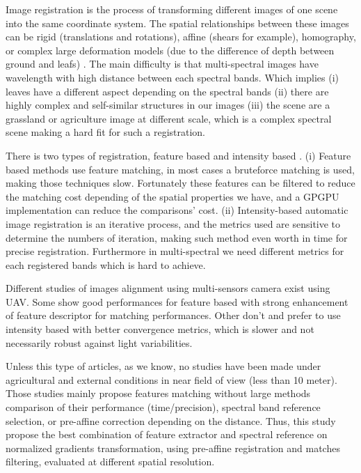 \documentclass[]{elsarticle}
\begin{document}
	Image registration is the process of transforming different images of one scene into the same coordinate system.
	The spatial relationships between these images can be rigid (translations and rotations), affine (shears for example),
	homography, or complex large deformation models (due to the difference of depth between ground and leafs) \cite{Kamoun}.
	The main difficulty is that multi-spectral images have wavelength with high distance between each spectral bands.
	Which implies (i) leaves have a different aspect depending on the spectral bands
	(ii) there are highly complex and self-similar structures in our images
	(iii) the scene are a grassland or agriculture image at different scale, which is a complex spectral scene making a hard fit for such a registration.
	\\
	\par There is two types of registration, feature based and intensity based \cite{Zitova}.
	(i) Feature based methods use feature matching, in most cases a bruteforce matching is used, making those techniques slow.
	Fortunately these features can be filtered to reduce the matching cost depending of the spatial properties we have, and a GPGPU implementation can reduce the comparisons' cost.
	(ii) Intensity-based automatic image registration is an iterative process, and the metrics used are sensitive to determine the numbers of iteration,
	making such method even worth in time for precise registration. Furthermore in multi-spectral we need different metrics for each registered bands which is hard to achieve.
	\\
	\par Different studies of images alignment using multi-sensors camera exist using UAV.
	Some show good performances for feature based \cite{DantasDiasJunior, Vakalopoulou} with strong enhancement of feature descriptor for matching performances.
	Other don't and prefer to use intensity based \cite{douarre:hal-02183837} with better convergence metrics, which is slower and not necessarily robust against light variabilities.
	\\
	\par Unless this type of articles, as we know, no studies have been made under agricultural and external conditions in near field of view (less than 10 meter).
	Those studies mainly propose features matching without large methods comparison of their performance (time/precision),
	spectral band reference selection, or pre-affine correction depending on the distance.
	Thus, this study propose the best combination of feature extractor and spectral reference on normalized gradients transformation,
	using pre-affine registration and matches filtering, evaluated at different spatial resolution.
	
\end{document}
